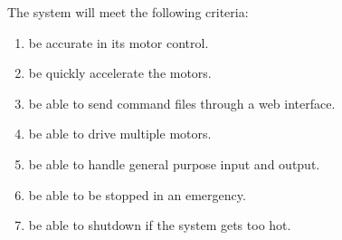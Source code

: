 The system will meet the following criteria:
\begin{enumerate} \parskip2pt
	
	\item be accurate in its motor control.
	\item be quickly accelerate the motors.
	\item be able to send command files through a web interface.
	\item be able to drive multiple motors.
	\item be able to handle general purpose input and output.
	\item be able to be stopped in an emergency.
	\item be able to shutdown if the system gets too hot. 
\end{enumerate}